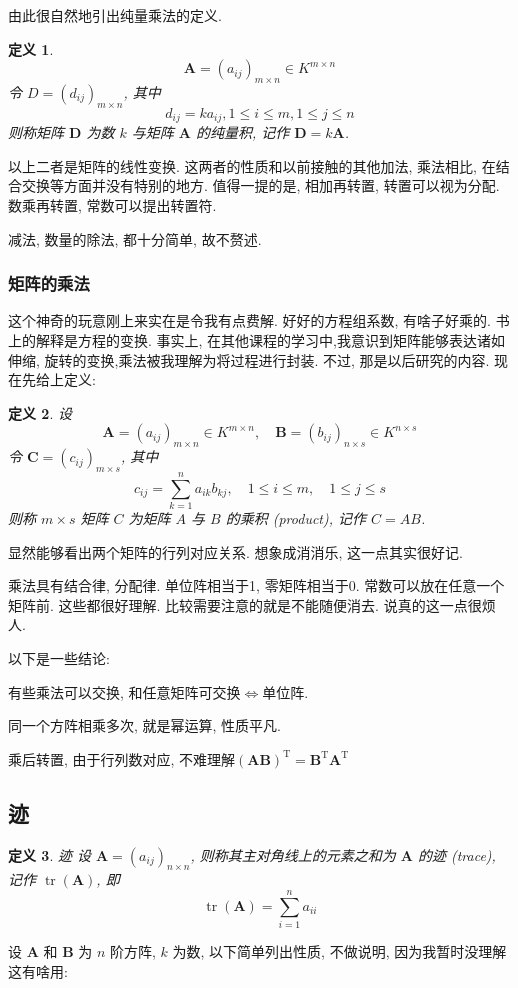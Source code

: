 \documentclass{article}
\newtheorem{mydef}{定义}
\begin{document}
由此很自然地引出纯量乘法的定义.

\begin{mydef}
$$
\boldsymbol{A}=\left(a_{i j}\right)_{m \times n} \in K^{m \times n}
$$
令 $D=\left(d_{i j}\right)_{m \times n}$, 其中
$$
d_{i j}=k a_{i j}, 1 \leq i \leq m, 1 \leq j \leq n
$$
则称矩阵 $\boldsymbol{D}$ 为数 $k$ 与矩阵 $\boldsymbol{A}$ 的纯量积, 记作 $\boldsymbol{D}=k \boldsymbol{A}$.
\end{mydef}

以上二者是矩阵的线性变换. 这两者的性质和以前接触的其他加法, 乘法相比, 在结合交换等方面并没有特别的地方. 值得一提的是, 相加再转置, 转置可以视为分配. 数乘再转置, 常数可以提出转置符.

减法, 数量的除法, 都十分简单, 故不赘述.

\subsubsection{矩阵的乘法}
这个神奇的玩意刚上来实在是令我有点费解. 好好的方程组系数, 有啥子好乘的. 书上的解释是方程的变换. 事实上, 在其他课程的学习中,我意识到矩阵能够表达诸如伸缩, 旋转的变换,乘法被我理解为将过程进行封装. 不过, 那是以后研究的内容. 现在先给上定义:
\begin{mydef}
设
$$
\boldsymbol{A}=\left(a_{i j}\right)_{m \times n} \in K^{m \times n}, \quad \boldsymbol{B}=\left(b_{i j}\right)_{n \times s} \in K^{n \times s}
$$
令 $\boldsymbol{C}=\left(c_{i j}\right)_{m \times s}$, 其中
$$
c_{i j}=\sum_{k=1}^{n} a_{i k} b_{k j}, \quad 1 \leq i \leq m, \quad 1 \leq j \leq s
$$
则称 $m \times s$ 矩阵 $C$ 为矩阵 $A$ 与 $B$ 的乘积 (product), 记作 $C=A B$.
\end{mydef}

显然能够看出两个矩阵的行列对应关系. 想象成消消乐, 这一点其实很好记.

乘法具有结合律, 分配律. 单位阵相当于1, 零矩阵相当于0. 常数可以放在任意一个矩阵前. 这些都很好理解. 比较需要注意的就是不能随便消去. 说真的这一点很烦人.

以下是一些结论:

有些乘法可以交换, 和任意矩阵可交换$\Leftrightarrow$单位阵.

同一个方阵相乘多次, 就是幂运算, 性质平凡.

乘后转置, 由于行列数对应, 不难理解$\left(\boldsymbol{AB}\right) ^{\mathrm{T}}=\boldsymbol{B}^{\mathrm{T}}\boldsymbol{A}^{\mathrm{T}}$

\subsection{迹}
\begin{mydef}{迹}
	设 $\boldsymbol{A}=\left(a_{i j}\right)_{n \times n}$, 则称其主对角线上的元素之和为 $\boldsymbol{A}$ 的迹 (trace), 记作 $\operatorname{tr}(\boldsymbol{A})$, 即
$$
\operatorname{tr}(\boldsymbol{A})=\sum_{i=1}^{n} a_{i i}
$$
\end{mydef}
设 $\boldsymbol{A}$ 和 $\boldsymbol{B}$ 为 $n$ 阶方阵, $k$ 为数, 以下简单列出性质, 不做说明, 因为我暂时没理解这有啥用:
\end{document}
